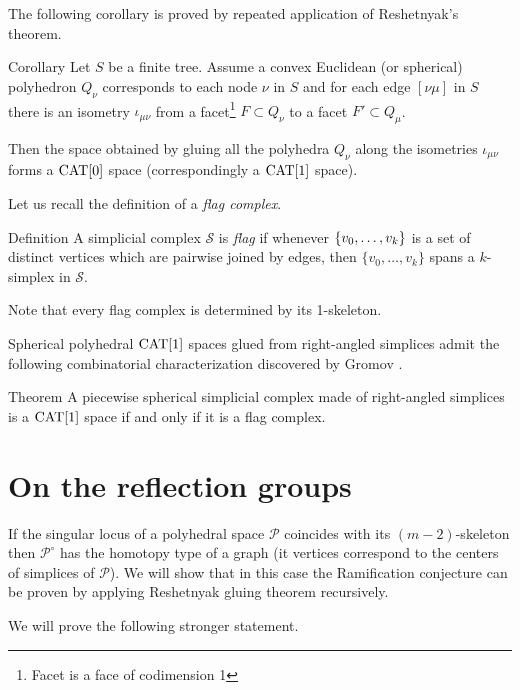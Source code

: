 \documentclass[oneside,a4paper]{article}
\begin{document}
The following corollary is proved by repeated application of Reshetnyak's theorem.


\begin{thm}{Corollary}\label{cor:resh}
Let $S$ be a finite tree.
Assume a convex Euclidean (or spherical) polyhedron $Q_\nu$
corresponds to each node $\nu$ in $S$
and for each edge $[\nu\mu]$ in $S$
there is an isometry $\iota_{\mu\nu}$
from a facet\footnote{Facet is a face of codimension 1} $F\subset Q_\nu$ to a facet $F'\subset Q_\mu$.

Then the space obtained by gluing all the polyhedra $Q_\nu$ along the isometries $\iota_{\mu\nu}$ forms a $\mathrm{CAT}[0]$ space (correspondingly a $\mathrm{CAT}[1]$ space).
\end{thm}

Let us recall the definition of a \emph{flag complex}.

\begin{thm}{Definition}
A simplicial complex $\mathcal{S}$ is \emph{flag} if whenever $\{v_0,\z\dots,v_k\}$
is a set of distinct vertices which are pairwise joined by edges, then $\{v_0,\dots,v_k\}$
spans a $k$-simplex in $\mathcal{S}$.
\end{thm}

Note that every flag complex is determined by its 1-skeleton.

Spherical polyhedral $\mathrm{CAT}[1]$ spaces glued from right-angled simplices
admit the following combinatorial characterization discovered by Gromov \cite[p. 122]{gromov-hyp-group}.

\begin{thm}{Theorem}
 A piecewise spherical simplicial complex made of right-angled simplices is a $\mathrm{CAT}[1]$ space if and only if it is a flag complex.
\end{thm}



\section{On the reflection groups}

If the singular locus of a polyhedral space $\mathcal{P}$ coincides with its $(m-2)$-skeleton
then $\mathcal{P}^\circ$ has the homotopy type of a graph (it vertices
correspond to the centers of simplices of $\mathcal{P}$).
We will show that in this case the Ramification conjecture can be proven by applying Reshetnyak gluing theorem recursively.

We will prove the following stronger statement.
\end{document}
